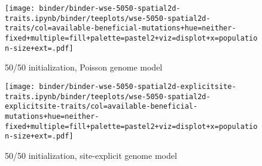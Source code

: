 \begin{sidewaysfigure}[h]
  \rotatesidewayslabel

    \begin{subfigure}[b]{0.47\linewidth}
        \begin{minipage}{\textwidth}
          \texttt{[image: binder/binder-wse-5050-spatial2d-traits.ipynb/binder/teeplots/wse-5050-spatial2d-traits/col=available-beneficial-mutations+hue=neither-fixed+multiple=fill+palette=pastel2+viz=displot+x=population-size+ext=.pdf]}%
        \end{minipage}
        \begin{minipage}{\textwidth}
        \caption{50/50 initialization, Poisson genome model}
        \label{fig:neither-fixed-wse-256atile:5050}
        \end{minipage}%
    \end{subfigure}%

    \begin{subfigure}[b]{0.53\linewidth}
        \begin{minipage}{\textwidth}
          \texttt{[image: binder/binder-wse-5050-spatial2d-explicitsite-traits.ipynb/binder/teeplots/wse-5050-spatial2d-explicitsite-traits/col=available-beneficial-mutations+hue=neither-fixed+multiple=fill+palette=pastel2+viz=displot+x=population-size+ext=.pdf]}%
        \end{minipage}
        \begin{minipage}{\textwidth}
        \caption{50/50 initialization, site-explicit genome model}
        \label{fig:neither-fixed-wse-256atile:5050-explicitsite}
        \end{minipage}%
    \end{subfigure}


\end{sidewaysfigure}
